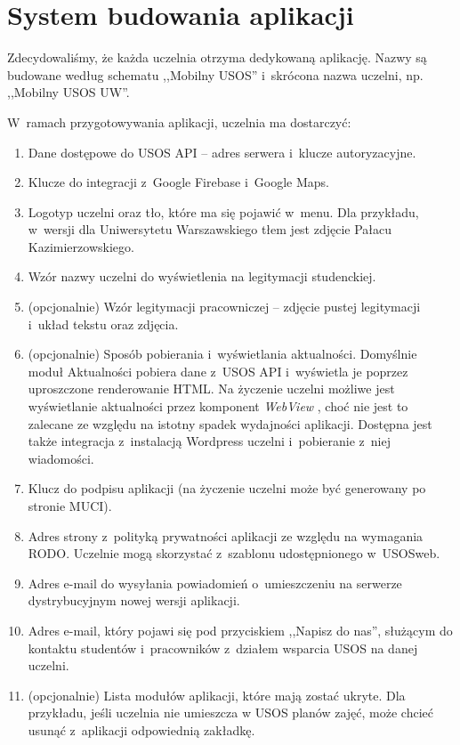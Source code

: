 \documentclass{pracamgr}
\begin{document}
\section{System budowania aplikacji}

Zdecydowaliśmy, że każda uczelnia otrzyma dedykowaną aplikację. Nazwy są budowane według schematu ,,Mobilny USOS'' i~skrócona nazwa uczelni, np. ,,Mobilny USOS UW''. 

W~ramach przygotowywania aplikacji, uczelnia ma dostarczyć:
\begin{enumerate}
	\item Dane dostępowe do USOS API -- adres serwera i~klucze autoryzacyjne.
	\item Klucze do integracji z~Google Firebase i~Google Maps.
	\item Logotyp uczelni oraz tło, które ma się pojawić w~menu. Dla przykładu, w~wersji dla Uniwersytetu Warszawskiego
        tłem jest zdjęcie Pałacu Kazimierzowskiego.
	\item Wzór nazwy uczelni do wyświetlenia na legitymacji studenckiej.
	\item (opcjonalnie) Wzór legitymacji pracowniczej -- zdjęcie pustej legitymacji i~układ tekstu oraz zdjęcia.
	\item (opcjonalnie) Sposób pobierania i~wyświetlania aktualności. Domyślnie moduł Aktualności pobiera dane z~USOS
        API i~wyświetla je poprzez uproszczone renderowanie HTML. Na życzenie uczelni możliwe jest wyświetlanie
        aktualności przez komponent \textit{WebView} \cite{webview}, choć nie jest to zalecane ze względu na istotny
        spadek wydajności aplikacji. Dostępna jest także integracja z~instalacją Wordpress uczelni i~pobieranie z~niej wiadomości.
	\item Klucz do podpisu aplikacji (na życzenie uczelni może być generowany po stronie MUCI).
	\item Adres strony z~polityką prywatności aplikacji ze względu na wymagania RODO. Uczelnie mogą skorzystać z~szablonu udostępnionego w~USOSweb.
	\item Adres e-mail do wysyłania powiadomień o~umieszczeniu na serwerze dystrybucyjnym nowej wersji aplikacji.
	\item Adres e-mail, który pojawi się pod przyciskiem ,,Napisz do nas'', służącym do kontaktu studentów i~pracowników z~działem wsparcia USOS na danej uczelni.
	\item (opcjonalnie) Lista modułów aplikacji, które mają zostać ukryte. Dla przykładu, jeśli
	uczelnia nie umieszcza w USOS planów zajęć, może chcieć usunąć z~aplikacji odpowiednią
	zakładkę.
\end{enumerate}
\end{document}
